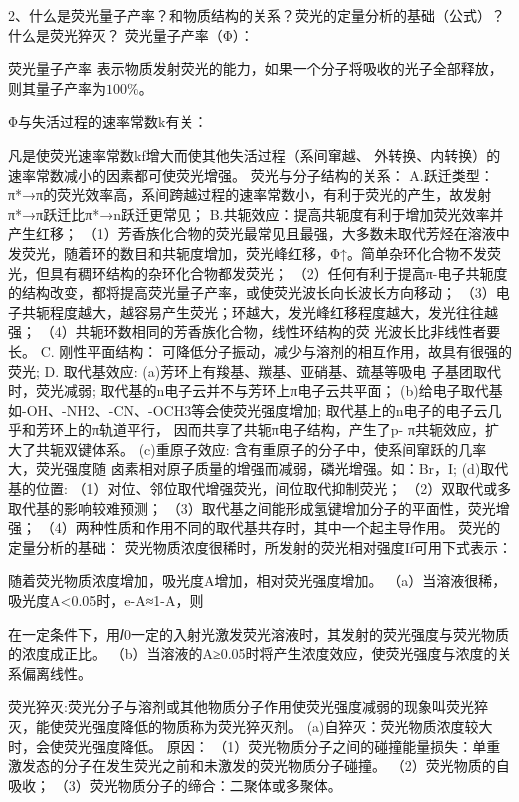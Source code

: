 2、什么是荧光量子产率？和物质结构的关系？荧光的定量分析的基础（公式）？什么是荧光猝灭？
荧光量子产率（Φ）：
\begin{definition*}{荧光量子产率}{}
	 表示物质发射荧光的能力，如果一个分子将吸收的光子全部释放，则其量子产率为$100\%$。
\end{definition*}

Φ与失活过程的速率常数k有关：

凡是使荧光速率常数kf增大而使其他失活过程（系间窜越、 外转换、内转换）的速率常数减小的因素都可使荧光增强。
荧光与分子结构的关系：
A.跃迁类型：π*→π的荧光效率高，系间跨越过程的速率常数小，有利于荧光的产生，故发射 π*→π跃迁比π*→n跃迁更常见；
B.共轭效应：提高共轭度有利于增加荧光效率并产生红移；
（1）芳香族化合物的荧光最常见且最强，大多数未取代芳烃在溶液中发荧光，随着环的数目和共轭度增加，荧光峰红移，Φ↑。简单杂环化合物不发荧光，但具有稠环结构的杂环化合物都发荧光；
（2）任何有利于提高π-电子共轭度的结构改变，都将提高荧光量子产率，或使荧光波长向长波长方向移动；
（3）电子共轭程度越大，越容易产生荧光；环越大，发光峰红移程度越大，发光往往越强；
（4）共轭环数相同的芳香族化合物，线性环结构的荧 光波长比非线性者要长。
C. 刚性平面结构：
可降低分子振动，减少与溶剂的相互作用，故具有很强的荧光;
D. 取代基效应:
(a)芳环上有羧基、羰基、亚硝基、巯基等吸电 子基团取代时，荧光减弱;
取代基的n电子云并不与芳环上π电子云共平面；
(b)给电子取代基如-OH、-NH2、-CN、-OCH3等会使荧光强度增加;
取代基上的n电子的电子云几乎和芳环上的π轨道平行， 因而共享了共轭π电子结构，产生了p- π共轭效应，扩大了共轭双键体系。
(c)重原子效应: 含有重原子的分子中，使系间窜跃的几率大，荧光强度随 卤素相对原子质量的增强而减弱，磷光增强。如：Br，I;
(d)取代基的位置:
（1）对位、邻位取代增强荧光，间位取代抑制荧光；
（2）双取代或多取代基的影响较难预测；
（3）取代基之间能形成氢键增加分子的平面性，荧光增强；
（4）两种性质和作用不同的取代基共存时，其中一个起主导作用。
荧光的定量分析的基础：
荧光物质浓度很稀时，所发射的荧光相对强度If可用下式表示：

随着荧光物质浓度增加，吸光度A增加，相对荧光强度增加。
（a）当溶液很稀，吸光度A<0.05时，e-A≈1-A，则 

在一定条件下，用𝐼0一定的入射光激发荧光溶液时，其发射的荧光强度与荧光物质的浓度成正比。
（b）当溶液的A≥0.05时将产生浓度效应，使荧光强度与浓度的关系偏离线性。

荧光猝灭:荧光分子与溶剂或其他物质分子作用使荧光强度减弱的现象叫荧光猝灭，能使荧光强度降低的物质称为荧光猝灭剂。
(a)自猝灭：荧光物质浓度较大时，会使荧光强度降低。
原因：
（1）荧光物质分子之间的碰撞能量损失：单重激发态的分子在发生荧光之前和未激发的荧光物质分子碰撞。
（2）荧光物质的自吸收；
（3）荧光物质分子的缔合：二聚体或多聚体。

